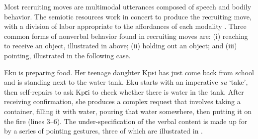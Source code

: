 \documentclass[output=paper]{langsci/langscibook}
\begin{document}
Most recruiting moves are multimodal utterances composed of speech and bodily behavior. The semiotic resources work in concert to produce the recruiting move, with a division of labor appropriate to the affordances of each modality \citep{goodwin_action_2000,clark_wordless_2012}. Three common forms of nonverbal behavior found in recruiting moves are: (i) reaching to receive an object, illustrated in   above; (ii) holding out an object; and (iii) pointing, illustrated in the following case.

Eku is preparing food. Her teenage daughter Kpɛi has just come back from school and is standing next to the water tank. Eku starts with an imperative \textit{su} ‘take’, then self-repairs to ask Kpɛi to check whether there is water in the tank. After receiving confirmation, she produces a complex request that involves taking a container, filling it with water, pouring that water somewhere, then putting it on the fire (lines 3--6). The under-specification of the verbal content is made up for by a series of pointing gestures, three of which are illustrated in .
\end{document}
